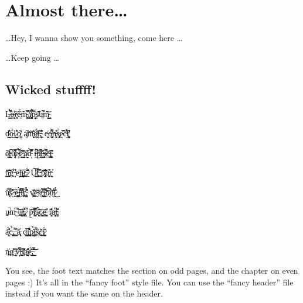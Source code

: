 

\Clear
\chapter{Almost there\dots}
\label{cha:almost_there}

\vspace*{160pt}

\centering

\dots Hey, I wanna show you something, come here \dots

\newpage

\vspace*{200pt}

\dots Keep going \dots

\newpage

\section{Wicked stuffff!}
\label{sec:wicked_stuffff}

L̶͇̉͋̊̚o̶̜̭͉͉̠̾̇r̴̨͎͕̀͝ë̵̼́m̵̧͔͍̦̂̑̀̔̚ ̸̻̬̝͌i̸̥̻͙̫̾͆̒͠p̵̡̞̗̦̫̋͝ṣ̸̈̆̂͑u̴͖̇͋̚m̵̺͇͝͠

d̷̘͇̎̓̓ő̴̺̀ľ̷͉̺̼̱͛̽ó̸̦͚̔̾̾ a̸̡͠m̴̖͈̥̒͂͝ȩ̸̯͎̈́́̎ț̶̋̓,̴͍͈͎͉̲̋͛̌͒̂ c̶̜̭͑ͅó̶̬͚̟͌͌̒̀n̶͕̫͎̊͐ṡ̴̡̡͓̜̀ḛ̴̏̅͑̕c̴͉̀͌̔̓͛t̸͈͉̥͚͛͒

ẽ̸̢͎̣̺̐t̵̝̱̮̠̚ŭ̸̡̜̥͉͊͐̿e̵̟̦͕̍̉̔̚ř̷̛͈̭͈̈́̓͝ ̴̢̮̰̠̋̊͗a̸̭͉̬̽̔d̴̛̦͛̿̍̀ ị̶̲̈́̕̚p̸̡̤͈̀́͛̚͝i̶̹̜͇̒͗̔̕ş̶͕̜̓̀̊͆͝c̵̥̘͖̠̄̎̎į̴̨̮͔͓̋̒͊̒

n̴̳̰̘̹̻͊̎̈̃͝g̶̼͑͋̏ ̴̩̩͛̾e̵̦͗͘ļ̵̱̳͑ỉ̷̲̝̙̦̪͠t̶̤͙̝̅.̷̱̤̋̈́̊͛ U̸̘̺̖͆̑̃̚͜͝ţ̶̠͚̋̅̇̓̓ ̴̨͕͑̏p̷̢̛̟̖̯̝̈́͐̽͝u̴̼͍̩͒͘ͅr̴̨̛͉̮

u̸̢͔̿̒̌ś̷͉͐͑̎̂ ̵̣̟̅e̶̤̯̦̰̪̋l̴̮͊̀͋̒͝i̵̧̐̊t̸̪̘̝̅,̵̦̻̽̊̉͐́ v̷͎̪̭͖̓͐͝ḙ̴̘̇̆s̵͔̈́ţ̴̜̯͉̤̿̎į̴̨̲͙̒͋̏͝b̷͉̈́̚u̵̬͛̇͝l̷̖̣͂͗̓̈́͜͜

u̷̱̚m̴͉͆ ̵̦͌u̶̱͓͉͚̇̒̈́̑ͅt̴̢͍̗͎̄͌,̷̛͓͆ p̴̹̰̏͑̈̚͝l̸̨͔̫̼̔̿̔ä̷̟̖͈́͑̀͐͊c̷̩͇͙̩̈̅ȇ̶̛̥̯̪̝̈̋ r̷͔̖̹̫̽̂̓̀a̴̩͔̦̙͆ͅt̴̡̮͊̆̕

à̶̰̦̘̹̈́̔̕c̶̩̻͎̉,̵̨̪̤̻͌ͅ ̵̫̱̜̓͐ã̵̧̢̩̓ ḑ̶͍̗̺̅͜i̵̭̺̪̯͈̐͋̍p̷͉̮͚̹̒̉í̶̡̥̥̫̂̔̚s̶̡̋c̶͍͍̰̠̈̃ḭ̷͚̠͕̈́̋

ṅ̵̪͐g̸̥̊̍ ̵̢̬̯͛͂v̶̖̦̀͆̐̏i̴̺̼͍̥̊̓t̸̡̎̐̈ą̶͓̘͍̠̄̾̓̕ë̵̙̱̩́͂̒̃͘͜͜,̵̲͈̲̲͖̔͂̏̚͝


\vspace{350pt}
You see, the foot text matches the section on odd pages, and the chapter on even pages :) It's all in the ``fancy foot'' style file. You can use the ``fancy header'' file instead if you want the same on the header.

